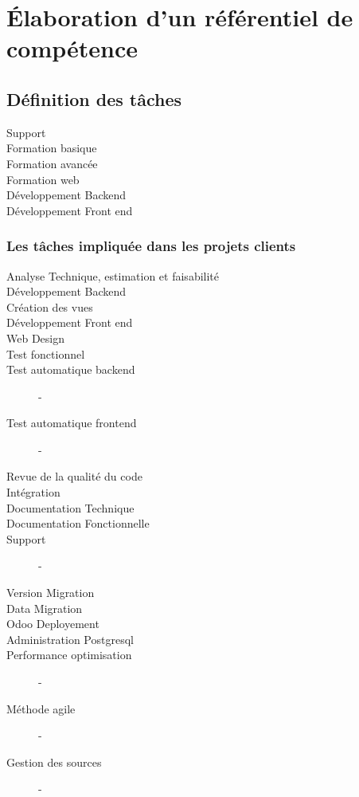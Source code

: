\chapter{Élaboration d'un référentiel de compétence}
\section{Définition des tâches}

\begin{description}
    \item[Support] 
    \item[Formation basique]
    \item[Formation avancée]
    \item[Formation web]
    \item[Développement Backend]
    \item[Développement Front end]
    
\end{description}

\subsection{Les tâches impliquée dans les projets clients}
\begin{description}
    \item[Analyse Technique, estimation et faisabilité] 
    \item[Développement Backend]
    \item[Création des vues]
    \item[Développement Front end]
    \item[Web Design]
    \item[Test fonctionnel]
    \item[Test automatique backend] -
    \item[Test automatique frontend] -
    \item[Revue de la qualité du code]
    \item[Intégration]
    \item[Documentation Technique]
    \item[Documentation Fonctionnelle]
    \item[Support] -
    \item[Version Migration]
    \item[Data Migration]
    \item[Odoo Deployement]
    \item[Administration Postgresql]
    \item[Performance optimisation] - 
    \item[Méthode agile]       -
    \item[Gestion des sources] -
\end{description}




